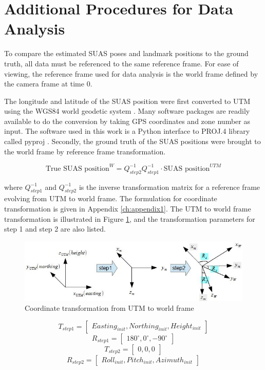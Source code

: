 \section{Additional Procedures for Data Analysis}
To compare the estimated SUAS poses and landmark positions to the ground
truth, all data must be referenced to the same reference frame. For
ease of viewing, the reference frame used for data analysis is the
world frame defined by the camera frame at time 0. 

The longitude and latitude of the SUAS position were first converted
to UTM using the WGS84 world geodetic system \cite{_world_????}. Many
software packages are readily available to do the conversion by taking GPS
coordinates and zone number as input. The software used in this work is
a Python interface to PROJ.4 library \cite{_pyproj_????} called pyproj
\cite{_pyproj_????}. Secondly, the ground truth of the SUAS positions
were brought to the world frame by reference frame transformation.

$$\text{True SUAS position}^W = 
Q_{step2}^{-1}Q_{step1}^{-1} \cdot\text{SUAS position}^{UTM}$$

\noindent where $Q_{step1}^{-1}$ and $Q_{step2}^{-1}$ is the inverse
transformation matrix for a reference frame evolving from UTM to world
frame. The formulation for coordinate transformation is given in
Appendix \ref{ch:appendix1}. The UTM to world frame transformation is
illustrated in Figure \ref{fig:utm_to_world}, and the transformation
parameters for step 1 and step 2 are also listed.

\begin{figure}[h]
  \centering
  \includegraphics[width=12cm,keepaspectratio=true]{./Figures/utm_to_world.jpg}
  \caption{Coordinate transformation from UTM to world frame}
  \label{fig:utm_to_world}
\end{figure}

$$T_{step1} = \begin{bmatrix}Easting_{init}, Northing_{init},
  Height_{init}\end{bmatrix}$$
$$R_{step1} = \begin{bmatrix}180^{\circ}, 0^{\circ},
  -90^{\circ}\end{bmatrix}$$
$$T_{step2} = \begin{bmatrix}0, 0, 0\end{bmatrix}$$
$$R_{step2} = \begin{bmatrix}Roll_{init}, Pitch_{init},
  Azimuth_{init}\end{bmatrix}$$

